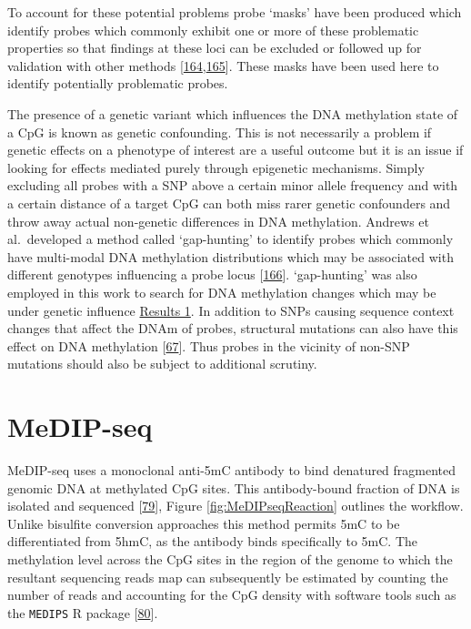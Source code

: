 \documentclass[
]{book}
\begin{document}
To account for these potential problems probe `masks' have been produced which identify probes which commonly exhibit one or more of these problematic properties so that findings at these loci can be excluded or followed up for validation with other methods {[}\protect\hyperlink{ref-Pidsley2016}{164},\protect\hyperlink{ref-Zhou2017}{165}{]}.
These masks have been used here to identify potentially problematic probes.

The presence of a genetic variant which influences the DNA methylation state of a CpG is known as genetic confounding.
This is not necessarily a problem if genetic effects on a phenotype of interest are a useful outcome but it is an issue if looking for effects mediated purely through epigenetic mechanisms.
Simply excluding all probes with a SNP above a certain minor allele frequency and with a certain distance of a target CpG can both miss rarer genetic confounders and throw away actual non-genetic differences in DNA methylation.
Andrews et al.~developed a method called `gap-hunting' to identify probes which commonly have multi-modal DNA methylation distributions which may be associated with different genotypes influencing a probe locus {[}\protect\hyperlink{ref-Andrews2016}{166}{]}.
`gap-hunting' was also employed in this work to search for DNA methylation changes which may be under genetic influence \protect\hyperlink{arrays}{Results 1}.
In addition to SNPs causing sequence context changes that affect the DNAm of probes, structural mutations can also have this effect on DNA methylation {[}\protect\hyperlink{ref-Bell2017a}{67}{]}.
Thus probes in the vicinity of non-SNP mutations should also be subject to additional scrutiny.

\hypertarget{MeDIPseq}{%
\section{MeDIP-seq}\label{MeDIPseq}}

MeDIP-seq uses a monoclonal anti-5mC antibody to bind denatured fragmented genomic DNA at methylated CpG sites.
This antibody-bound fraction of DNA is isolated and sequenced {[}\protect\hyperlink{ref-Down2009}{79}{]}, Figure \ref{fig:MeDIPseqReaction} outlines the workflow.
Unlike bisulfite conversion approaches this method permits 5mC to be differentiated from 5hmC, as the antibody binds specifically to 5mC.
The methylation level across the CpG sites in the region of the genome to which the resultant sequencing reads map can subsequently be estimated by counting the number of reads and accounting for the CpG density with software tools such as the \texttt{MEDIPS} R package {[}\protect\hyperlink{ref-Lienhard2014}{80}{]}.
\end{document}
